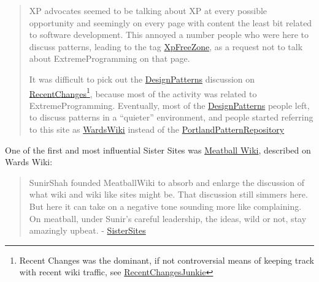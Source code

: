 \documentclass[10pt]{tufte-book}
\begin{document}
\begin{quote}
XP advocates seemed to be talking about XP at every possible opportunity
and seemingly on every page with content the least bit related to
software development. This annoyed a number people who were here to
discuss patterns, leading to the tag
\href{http://wiki.c2.com/?XpFreeZone}{XpFreeZone}, as a request not to
talk about ExtremeProgramming on that page.

It was difficult to pick out the
\href{http://wiki.c2.com/?DesignPatterns}{DesignPatterns} discussion on
\href{http://wiki.c2.com/?RecentChanges}{RecentChanges}\footnote{Recent
  Changes was the dominant, if not controversial means of keeping track
  with recent wiki traffic, see
  \href{http://wiki.c2.com/?RecentChangesJunkie}{RecentChangesJunkie}},
because most of the activity was related to ExtremeProgramming.
Eventually, most of the
\href{http://wiki.c2.com/?DesignPatterns}{DesignPatterns} people left,
to discuss patterns in a ``quieter'' environment, and people started
referring to this site as
\href{http://wiki.c2.com/?WardsWiki}{WardsWiki} instead of the
\href{http://wiki.c2.com/?PortlandPatternRepository}{PortlandPatternRepository}
\citep{C2wikiWikiHistory} 
\end{quote}

One of the first and most influential Sister Sites was
\href{http://meatballwiki.org/}{Meatball Wiki}, described on Wards Wiki:

\begin{quote}
SunirShah founded MeatballWiki to absorb and enlarge the discussion of
what wiki and wiki like sites might be. That discussion still simmers
here. But here it can take on a negative tone sounding more like
complaining. On meatball, under Sunir's careful leadership, the ideas,
wild or not, stay amazingly upbeat. -
\href{http://wiki.c2.com/?SisterSites}{SisterSites}
\end{quote}
\end{document}
